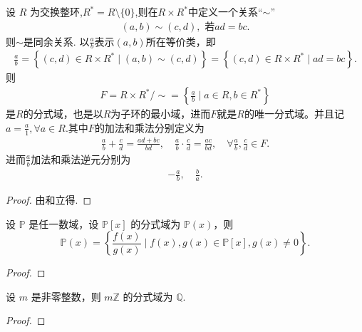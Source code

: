 \documentclass[../../main.tex]{subfiles}%
\begin{document}
\begin{corollary}\label{corollary:交换整环的分式与的具体形式}
设 \( R \) 为交换整环,$R^*=R\setminus \{0\}$,则在$R \times R^*$中定义一个关系“$\sim$”
\begin{align*}
\left( a,b \right) \sim \left( c,d \right) ,\,\,\text{若}ad=bc.
\end{align*}
则$\sim$是同余关系.
以$\frac{a}{b}$表示$(a,b)$所在等价类，即
\begin{align*}
\frac{a}{b} =\left\{ (c,d) \in R \times R^* \mid (a,b)\sim (c,d) \right\}= \left\{ (c,d) \in R \times R^* \mid ad = bc \right\}.
\end{align*}
则
\begin{align*}
F = R \times R^*/\sim = \left\{ \frac{a}{b} \mid a \in R, b \in R^* \right\}
\end{align*}
是$R$的分式域，也是以$R$为子环的最小域，进而$F$就是$R$的唯一分式域。并且记$a=\frac{a}{1},\forall a\in R.$其中$F$的加法和乘法分别定义为
\begin{align*}
\frac{a}{b}+\frac{c}{d}=\frac{ad+bc}{bd},\quad \frac{a}{b}\cdot \frac{c}{d}=\frac{ac}{bd},\quad \forall \frac{a}{b},\frac{c}{d}\in F.
\end{align*}
进而$\frac{a}{b}$加法和乘法逆元分别为
\begin{align*}
-\frac{a}{b},\quad \frac{b}{a}.
\end{align*}
\end{corollary}
\begin{proof}
由和立得.
\end{proof}

\begin{example}
设 \( \mathbb{P} \) 是任一数域，设 \( \mathbb{P}[x] \) 的分式域为 \( \mathbb{P}(x) \)，则
\[
\mathbb{P}(x) = \left\{ \frac{f(x)}{g(x)} \mid f(x), g(x) \in \mathbb{P}[x], g(x) \neq 0 \right\}.
\]
\end{example}
\begin{proof}

\end{proof}

\begin{proposition}\label{proposition:mZ的分式域都是Q}
设 \( m \) 是非零整数，则 \( m\mathbb{Z} \) 的分式域为 \( \mathbb{Q} \).
\end{proposition}
\begin{proof}

\end{proof}
\end{document}
